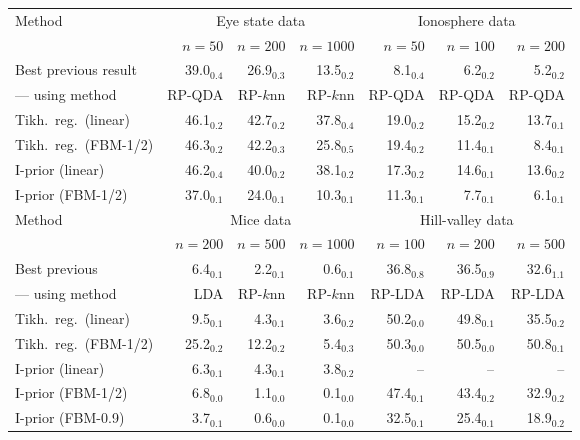 \documentclass[preprint,12pt,authoryear]{elsarticle}
\begin{document}
\begin{table}
	\scriptsize
	\centering
	\begin{tabular}{lrrrrrr}\hline
	Method & \multicolumn{3}{c}{Eye state data} & \multicolumn{3}{c}{Ionosphere data}  \\
	& $n=50$ & $n=200$ & $n=1000$   & $n=50$ & $n=100$ & $n=200$       \\ \hline
	Best previous result & 39.0$_{0.4}$ & 26.9$_{0.3}$ & 13.5$_{0.2}$ & \color{red}8.1$_{0.4}$ & \color{red}6.2$_{0.2}$ & \color{red}5.2$_{0.2}$ \\
	--- using method & \scriptsize RP-QDA & \scriptsize RP-$k$nn & \scriptsize RP-$k$nn  & \color{red}\scriptsize RP-QDA  & \color{red}\scriptsize RP-QDA  & \color{red}\scriptsize RP-QDA  \\
	Tikh.\ reg.\ (linear)  & 46.1$_{0.2}$ & 42.7$_{0.2}$ & 37.8$_{0.4}$ & 19.0$_{0.2}$ & 15.2$_{0.2}$ & 13.7$_{0.1}$   \\
	Tikh.\ reg.\ (FBM-1/2) & 46.3$_{0.2}$ & 42.2$_{0.3}$ & 25.8$_{0.5}$ & 19.4$_{0.2}$ & 11.4$_{0.1}$ & 8.4$_{0.1}$   \\
	I-prior (linear) & 46.2$_{0.4}$   &40.0$_{0.2}$& 38.1$_{0.2}$  & 17.3$_{0.2}$&	14.6$_{0.1}$&	13.6$_{0.2}$	\\
	I-prior (FBM-1/2)	&\color{red}37.0$_{0.1}$&\color{red}24.0$_{0.1}$ &\color{red}10.3$_{0.1}$&11.3$_{0.1}$	&7.7$_{0.1}$	&6.1$_{0.1}$  \\[2mm]
	
	\hline
	Method & \multicolumn{3}{c}{Mice data} & \multicolumn{3}{c}{Hill-valley data}  \\
	& $n=200$ & $n=500$ & $n=1000$   & $n=100$ & $n=200$ & $n=500$       \\ \hline
	Best previous & 6.4$_{0.1}$ & 2.2$_{0.1}$ & 0.6$_{0.1}$ & 36.8$_{0.8}$ & 36.5$_{0.9}$ & 32.6$_{1.1}$ \\
	--- using method & \scriptsize LDA  & \scriptsize RP-$k$nn & \scriptsize RP-$k$nn & \scriptsize RP-LDA  & \scriptsize RP-LDA  & \scriptsize RP-LDA   \\
	Tikh.\ reg.\ (linear) & 9.5$_{0.1}$ & 4.3$_{0.1}$ & 3.6$_{0.2}$ & 50.2$_{0.0}$ & 49.8$_{0.1}$ & 35.5$_{0.2}$  \\
	Tikh.\ reg.\ (FBM-1/2)& 25.2$_{0.2}$&12.2$_{0.2}$ & 5.4$_{0.3}$ & 50.3$_{0.0}$ & 50.5$_{0.0}$ & 50.8$_{0.1}$ \\
	I-prior (linear)      & 6.3$_{0.1}$ & 4.3$_{0.1}$ & 3.8$_{0.2}$ &--$_{}$&--$_{}$&	--$_{}$	\\
	I-prior (FBM-1/2)     & 6.8$_{0.0}$ & 1.1$_{0.0}$ & 0.1$_{0.0}$ &47.4$_{0.1}$&	43.4$_{0.2}$&	32.9$_{0.2}$    \\
	I-prior (FBM-0.9)     & \color{red}3.7$_{0.1}$ & \color{red}$0.6_{0.0}$ &\color{red} 0.1$_{0.0}$                   &\color{red}32.5$_{0.1}$&	\color{red}25.4$_{0.1}$&	\color{red}18.9$_{0.2}$    \\[2mm]
	

\end{tabular}
\end{table}
\end{document}
